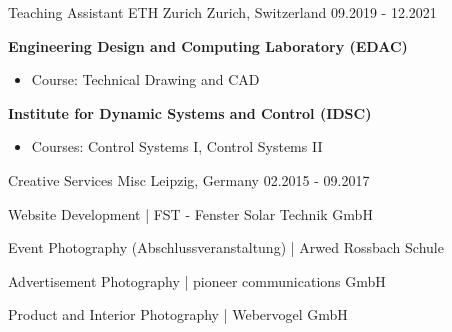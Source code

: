 \begin{cvskills}
    \cventry
    {Teaching Assistant}
    {ETH Zurich}
    {Zurich, Switzerland}
    {09.2019 - 12.2021}
    {
    \begin{cvitems}
        \item \textbf{Engineering Design and Computing Laboratory (EDAC)}
        \begin{itemize}
            \item Course: Technical Drawing and CAD
        \end{itemize}
        \item \textbf{Institute for Dynamic Systems and Control (IDSC)}
        \begin{itemize}
            \item Courses: Control Systems I, Control Systems II
        \end{itemize}
    \end{cvitems}
    }

    \cventry
    {Creative Services}
    {Misc}
    {Leipzig, Germany}
    {02.2015 - 09.2017} %
    {\begin{cvitems}
        \item Website Development | FST - Fenster Solar Technik GmbH
        \item Event Photography (Abschlussveranstaltung) | Arwed Rossbach Schule
        \item Advertisement Photography | pioneer communications GmbH
        \item Product and Interior Photography | Webervogel GmbH
    \end{cvitems}
    }
    
\end{cvskills}